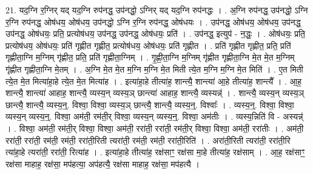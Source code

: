 \documentclass[17pt]{extarticle}
\begin{document}
21. यद॒ग्नि र॒ग्निर् यद् यद॒ग्नि रुप॑नद्ध॒ उप॑नद्धो॒ ऽग्निर् यद् यद॒ग्नि रुप॑नद्धः । . अ॒ग्नि रुप॑नद्ध॒ उप॑नद्धो॒ ऽग्नि र॒ग्नि रुप॑नद्ध॒ ओष॑धय॒ ओष॑धय॒ उप॑नद्धो॒ ऽग्नि र॒ग्नि रुप॑नद्ध॒ ओष॑धयः । . उप॑नद्ध॒ ओष॑धय॒ ओष॑धय॒ उप॑नद्ध॒ उप॑नद्ध॒ ओष॑धयः॒ प्रति॒ प्रत्योष॑धय॒ उप॑नद्ध॒ उप॑नद्ध॒ ओष॑धयः॒ प्रति॑ । . उप॑नद्ध॒ इत्युप॑ - न॒द्धः॒ । . ओष॑धयः॒ प्रति॒ प्रत्योष॑धय॒ ओष॑धयः॒ प्रति॑ गृह्णीत गृह्णीत॒ प्रत्योष॑धय॒ ओष॑धयः॒ प्रति॑ गृह्णीत । . प्रति॑ गृह्णीत गृह्णीत॒ प्रति॒ प्रति॑ गृह्णीता॒ग्नि म॒ग्निम् गृ॑ह्णीत॒ प्रति॒ प्रति॑ गृह्णीता॒ग्निम् । . गृ॒ह्णी॒ता॒ग्नि म॒ग्निम् गृ॑ह्णीत गृह्णीता॒ग्नि मे॒त मे॒त म॒ग्निम् गृ॑ह्णीत गृह्णीता॒ग्नि मे॒तम् । . अ॒ग्नि मे॒त मे॒त म॒ग्नि म॒ग्नि मे॒त मिती त्ये॒त म॒ग्नि म॒ग्नि मे॒त मिति॑ । . ए॒त मिती त्ये॒त मे॒त मित्या॑हा॒हे त्ये॒त मे॒त मित्या॑ह । . इत्या॑हा॒हे तीत्या॑ह॒ शान्त्यै॒ शान्त्या॑ आ॒हे तीत्या॑ह॒ शान्त्यै᳚ । . आ॒ह॒ शान्त्यै॒ शान्त्या॑ आहाह॒ शान्त्यै॒ व्यस्य॒न् व्यस्य॒ञ् छान्त्या॑ आहाह॒ शान्त्यै॒ व्यस्यन्न्॑ । . शान्त्यै॒ व्यस्य॒न् व्यस्य॒ञ् छान्त्यै॒ शान्त्यै॒ व्यस्य॒न्॒. विश्वा॒ विश्वा॒ व्यस्य॒ञ् छान्त्यै॒ शान्त्यै॒ व्यस्य॒न्॒. विश्वाः᳚ । . व्यस्य॒न्॒. विश्वा॒ विश्वा॒ व्यस्य॒न् व्यस्य॒न्॒. विश्वा॒ अम॑ती॒ रम॑ती॒र् विश्वा॒ व्यस्य॒न् व्यस्य॒न्॒. विश्वा॒ अम॑तीः । . व्यस्य॒न्निति॑ वि - अस्यन्न्॑ । . विश्वा॒ अम॑ती॒ रम॑ती॒र् विश्वा॒ विश्वा॒ अम॑ती॒ ररा॑ती॒ ररा॑ती॒ रम॑ती॒र् विश्वा॒ विश्वा॒ अम॑ती॒ ररा॑तीः । . अम॑ती॒ ररा॑ती॒ ररा॑ती॒ रम॑ती॒ रम॑ती॒ ररा॑ती॒रिती त्यरा॑ती॒ रम॑ती॒ रम॑ती॒ ररा॑ती॒रिति॑ । . अरा॑ती॒रिती त्यरा॑ती॒ ररा॑ती॒रि त्या॑हा॒हे त्यरा॑ती॒ ररा॑ती॒ रित्या॑ह । . इत्या॑हा॒हे तीत्या॑ह॒ रक्ष॑साꣳ॒॒ रक्ष॑सा मा॒हे तीत्या॑ह॒ रक्ष॑साम् । . आ॒ह॒ रक्ष॑साꣳ॒॒ रक्ष॑सा माहाह॒ रक्ष॑सा॒ मप॑हत्या॒ अप॑हत्यै॒ रक्ष॑सा माहाह॒ रक्ष॑सा॒ मप॑हत्यै । \newline
\end{document}
